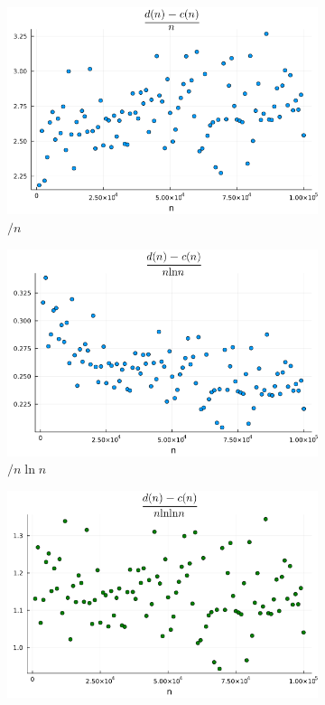 \documentclass{article}
\begin{document}
\begin{figure}[h]
    \centering
    \begin{subfigure}{0.32\textwidth}
        \centering
        \includegraphics[width=1.0\textwidth]{../results/d(n)-c(n)_1.png}
        \caption{$/ n$}
    \end{subfigure}
    \begin{subfigure}{0.32\textwidth}
        \centering
        \includegraphics[width=1.0\textwidth]{../results/d(n)-c(n)_2.png}
        \caption{$/ n \ln n$}
    \end{subfigure}
    \begin{subfigure}{0.32\textwidth}
        \centering
        \includegraphics[width=1.0\textwidth]{../results/d(n)-c(n)_3.png}

\end{subfigure}
\end{figure}
\end{document}

